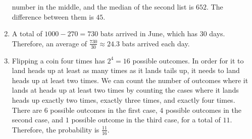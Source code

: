 \documentclass{article}
\begin{document}
\begin{enumerate}
		number in the middle, and the median of the second list is $652$. The 
		difference between them is $45$.
	\item A total of $1000 - 270 = 730$ bats arrived in June, which has $30$ 
		days. Therefore, an average of $\frac{730}{30} \approx 24.3$ bats 
		arrived each day.
	\item Flipping a coin four times has $2^4 = 16$ possible outcomes. In order 
		for it to land heads up at least as many times as it lands tails up, it 
		needs to land heads up at least two times. We can count the number of 
		outcomes where it lands at heads up at least two times by counting the 
		cases where it lands heads up exactly two times, exactly three times, 
		and exactly four times. There are $6$ possible outcomes in the first 
		case, $4$ possible outcomes in the second case, and $1$ possible outcome 
		in the third case, for a total of $11$. Therefore, the probability is 
		$\frac{11}{16}$.
\end{enumerate}
\end{document}

